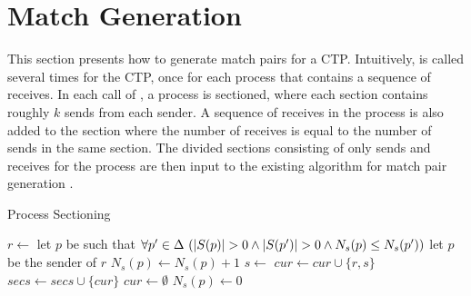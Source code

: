 \section{Match Generation}


This section presents how to generate match pairs for a CTP. 
Intuitively,  is called several times for the CTP, once for each process that contains a sequence of receives. 
In each call of , a process is sectioned, where each section contains roughly $k$ sends from each sender. A sequence of receives in the process is also added to the section where the number of receives is equal to the number of sends in the same section.
The divided sections consisting of only sends and receives for the process are then input to the existing algorithm for match pair generation \cite{DBLP:conf/kbse/HuangMM13}. 



\begin{algorithm}
\caption{Process Sectioning}\label{algo:main}
\begin{algorithmic}[1]
\State $r \gets$ 
\State let $p$ be such that $\forall p^\prime \in \Delta\ (|S(p)|>0  \wedge |S(p^\prime)|>0  \wedge \Call{$N_s$}{p}\le \Call{$N_s$}{p^\prime} )$
\Else 
\State let $p$ be the sender of $r$
\EndIf
\State $N_s(p)\gets N_s(p)+1$
\State $s\gets$ 
\State $\mathit{cur}\gets \mathit{cur}\cup \{r,s\}$
\State $\mathit{secs}\gets\mathit{secs}\cup\{\mathit{cur}\}$
\State $\mathit{cur}\gets\emptyset$
\State $N_s(p)\gets 0$
\EndFor
\EndIf
\EndWhile
\end{algorithmic}
\end{algorithm}



